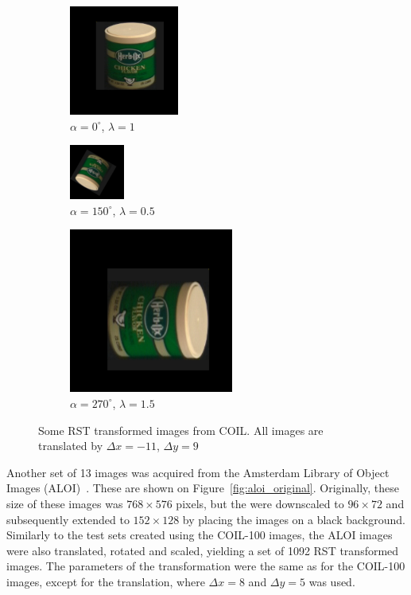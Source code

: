 \begin{figure}[tbp]
	\begin{subfigure}{0.29\textwidth}
        \centering
    \includegraphics[width=102pt]{figures/coil_rst/26x-11y9r0s1_0.png}
    \caption{$\alpha=0^{\circ}$, $\lambda=1$}
	\end{subfigure}
	\begin{subfigure}{0.28\textwidth}
        \centering
    \includegraphics[width=51pt]{figures/coil_rst/26x-11y9r150s0_5.png}
    \caption{$\alpha=150^{\circ}$, $\lambda=0.5$}
	\end{subfigure}
	\begin{subfigure}{0.40\textwidth}
        \centering
    \includegraphics[width=153pt]{figures/coil_rst/26x-11y9r270s1_75.png}
    \caption{$\alpha=270^{\circ}$, $\lambda=1.5$}
	\end{subfigure}
	\caption{Some RST transformed images from COIL. All images are translated by $\Delta x = -11$, $\Delta y = 9$}
	\label{fig:coil_rst}
\end{figure}

Another set of 13 images was acquired from the Amsterdam Library of Object Images (ALOI)~\cite{aloi}. These are shown on Figure~\ref{fig:aloi_original}. Originally, these size of these images was $768 \times 576$ pixels, but the were downscaled to $96 \times 72$ and subsequently extended to $152 \times 128$ by placing the images on a black background. Similarly to the test sets created using the COIL-100 images, the ALOI images were also translated, rotated and scaled, yielding a set of 1092 RST transformed images. The parameters of the transformation were the same as for the COIL-100 images, except for the translation, where $\Delta x = 8$ and $\Delta y = 5$ was used.

